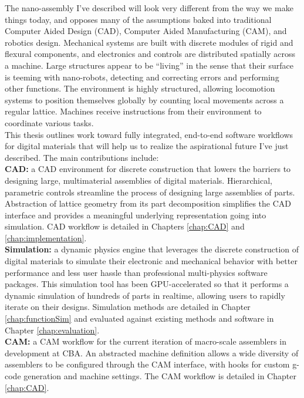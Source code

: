 {The nano-assembly I've described will look very different from the way we make things today, and opposes many of the assumptions baked into traditional Computer Aided Design (CAD),  Computer Aided Manufacturing (CAM), and robotics design.  Mechanical systems are built with discrete modules of rigid and flexural components, and electronics and controls are distributed spatially across a machine.  Large structures appear to be ``living'' in the sense that their surface is teeming with nano-robots, detecting and correcting errors and performing other functions.  The environment is highly structured, allowing locomotion systems to position themselves globally by counting local movements across a regular lattice.  Machines receive instructions from their environment to coordinate various tasks.%
\\

This thesis outlines work toward fully integrated, end-to-end software workflows for digital materials that will help us to realize the aspirational future I've just described.  The main contributions include:\\

\textbf{CAD:} a CAD environment for discrete construction that lowers the barriers to designing large, multimaterial assemblies of digital materials.  Hierarchical, parametric controls streamline the process of designing large assemblies of parts.   Abstraction of lattice geometry from its part decomposition simplifies the CAD interface and provides a meaningful underlying representation going into simulation.  CAD workflow is detailed in Chapters \ref{chap:CAD} and \ref{chap:implementation}.\\

\textbf{Simulation:} a dynamic physics engine that leverages the discrete construction of digital materials to simulate their electronic and mechanical behavior with better performance and less user hassle than professional multi-physics software packages.  This simulation tool has been GPU-accelerated so that it performs a dynamic simulation of hundreds of parts in realtime, allowing users to rapidly iterate on their designs.  Simulation methods are detailed in Chapter \ref{chap:functionSim} and evaluated against existing methods and software in Chapter \ref{chap:evaluation}.\\

\textbf{CAM:} a CAM workflow for the current iteration of macro-scale assemblers in development at CBA.  An abstracted machine definition allows a wide diversity of assemblers to be configured through the CAM interface, with hooks for custom g-code generation and machine settings.  The CAM workflow is detailed in Chapter \ref{chap:CAD}.\\

}
